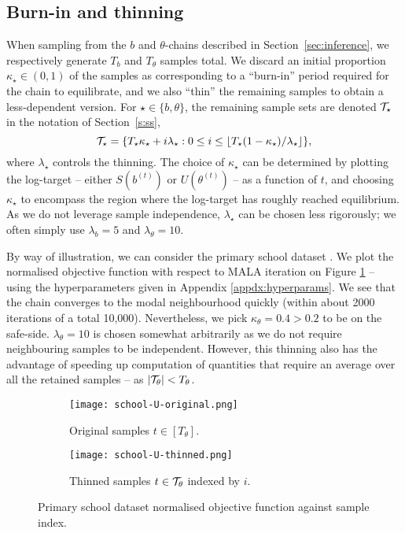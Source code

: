 \FloatBarrier
\subsection{Burn-in and thinning}
\label{appdx:burn-in-thinning}

When sampling from the $b$ and $\theta$-chains described
in Section~\ref{sec:inference}, we respectively generate
$T_b$ and $T_\theta$ samples total.
We discard an initial proportion $\kappa_\star\in(0,1)$ of the samples 
as corresponding to a ``burn-in'' period required for the chain to equilibrate,
and we also ``thin'' the remaining samples to 
obtain a less-dependent version. For $\star\in\{b,\theta\}$,
the remaining sample sets are denoted $\mathcal{T}_\star$
in the notation of Section~\ref{s:ss},
%
\begin{equation}
	\mathcal{T}_\star = \{T_\star \kappa_\star + i \lambda_\star :  
	0 \leq i \leq \lfloor T_\star(1 - \kappa_\star) / \lambda_\star \rfloor \},
\end{equation}
%
where $\lambda_\star$ controls the thinning. The choice of
$\kappa_\star$ can be determined by plotting the log-target -- either $S(b^{(t)})$ 
or $U(\theta^{(t)})$ -- as a function of $t$,
and choosing $\kappa_\star$ to encompass the region where the log-target has 
roughly reached equilibrium. As we do not leverage sample independence,
$\lambda_\star$ can be chosen less rigorously; we often simply
use $\lambda_b=5$ and $\lambda_\theta = 10$.

By way of illustration, we can consider the primary school dataset \cite{schools}. We plot the normalised objective function with respect to MALA iteration on Figure \ref{fig:school-U-orginal} -- using the hyperparameters given in Appendix \ref{appdx:hyperparams}. We see that the chain converges to the modal neighbourhood quickly (within about 2000 iterations of a total 10,000). Nevertheless, we pick $\kappa_\theta=0.4 > 0.2$ to be on the safe-side. $\lambda_\theta=10$ is chosen somewhat arbitrarily as we do not require neighbouring samples to be independent. However, this thinning also has the advantage of speeding up computation of quantities that require an average over all the retained samples -- as $|\mathcal{T}_\theta| < T_\theta$.
%
\begin{figure}[!h]
	\centering
	\begin{subfigure}[t]{0.42\linewidth}
		\centering
		\texttt{[image: school-U-original.png]}
		\caption{Original samples $t \in [T_\theta]$.}
		\label{fig:school-U-orginal}
	\end{subfigure}
	\begin{subfigure}[t]{0.42\linewidth}
		\centering
		\texttt{[image: school-U-thinned.png]}
		\caption{Thinned samples $t \in \mathcal{T}_\theta$ indexed by $i$.}
		\label{fig:school-U-thinned}
	\end{subfigure}
	\hspace{1cm}
	\caption{Primary school dataset normalised objective function against sample index.}
\end{figure}

